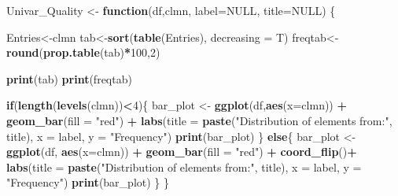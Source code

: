 \documentclass[
]{article}
\newenvironment{Shaded}{\begin{snugshade}}{\end{snugshade}}
\newcommand{\AttributeTok}[1]{\textcolor[rgb]{0.13,0.29,0.53}{#1}}
\newcommand{\ConstantTok}[1]{\textcolor[rgb]{0.56,0.35,0.01}{#1}}
\newcommand{\ControlFlowTok}[1]{\textcolor[rgb]{0.13,0.29,0.53}{\textbf{#1}}}
\newcommand{\DecValTok}[1]{\textcolor[rgb]{0.00,0.00,0.81}{#1}}
\newcommand{\FunctionTok}[1]{\textcolor[rgb]{0.13,0.29,0.53}{\textbf{#1}}}
\newcommand{\NormalTok}[1]{#1}
\newcommand{\OtherTok}[1]{\textcolor[rgb]{0.56,0.35,0.01}{#1}}
\newcommand{\SpecialCharTok}[1]{\textcolor[rgb]{0.81,0.36,0.00}{\textbf{#1}}}
\newcommand{\StringTok}[1]{\textcolor[rgb]{0.31,0.60,0.02}{#1}}
\begin{document}
\begin{Shaded}
\begin{Highlighting}[]
\NormalTok{Univar\_Quality }\OtherTok{\textless{}{-}} \ControlFlowTok{function}\NormalTok{(df,clmn, }\AttributeTok{label=}\ConstantTok{NULL}\NormalTok{, }\AttributeTok{title=}\ConstantTok{NULL}\NormalTok{) \{}
  
\NormalTok{  Entries}\OtherTok{\textless{}{-}}\NormalTok{clmn}
\NormalTok{  tab}\OtherTok{\textless{}{-}}\FunctionTok{sort}\NormalTok{(}\FunctionTok{table}\NormalTok{(Entries), }\AttributeTok{decreasing =}\NormalTok{ T)}
\NormalTok{  freqtab}\OtherTok{\textless{}{-}}\FunctionTok{round}\NormalTok{(}\FunctionTok{prop.table}\NormalTok{(tab)}\SpecialCharTok{*}\DecValTok{100}\NormalTok{,}\DecValTok{2}\NormalTok{)}

  \FunctionTok{print}\NormalTok{(tab)}
  \FunctionTok{print}\NormalTok{(freqtab)}
  
  \ControlFlowTok{if}\NormalTok{(}\FunctionTok{length}\NormalTok{(}\FunctionTok{levels}\NormalTok{(clmn))}\SpecialCharTok{\textless{}}\DecValTok{4}\NormalTok{)\{}
\NormalTok{      bar\_plot }\OtherTok{\textless{}{-}} \FunctionTok{ggplot}\NormalTok{(df,}\FunctionTok{aes}\NormalTok{(}\AttributeTok{x=}\NormalTok{clmn)) }\SpecialCharTok{+}
      \FunctionTok{geom\_bar}\NormalTok{(}\AttributeTok{fill =} \StringTok{"red"}\NormalTok{) }\SpecialCharTok{+}
      \FunctionTok{labs}\NormalTok{(}\AttributeTok{title =} \FunctionTok{paste}\NormalTok{(}\StringTok{"Distribution of elements from:"}\NormalTok{, title),}
           \AttributeTok{x =}\NormalTok{ label,}
           \AttributeTok{y =} \StringTok{"Frequency"}\NormalTok{)}
    \FunctionTok{print}\NormalTok{(bar\_plot)}
\NormalTok{  \} }\ControlFlowTok{else}\NormalTok{\{}
\NormalTok{  bar\_plot }\OtherTok{\textless{}{-}} \FunctionTok{ggplot}\NormalTok{(df, }\FunctionTok{aes}\NormalTok{(}\AttributeTok{x=}\NormalTok{clmn)) }\SpecialCharTok{+}
    \FunctionTok{geom\_bar}\NormalTok{(}\AttributeTok{fill =} \StringTok{"red"}\NormalTok{) }\SpecialCharTok{+}
    \FunctionTok{coord\_flip}\NormalTok{()}\SpecialCharTok{+}
    \FunctionTok{labs}\NormalTok{(}\AttributeTok{title =} \FunctionTok{paste}\NormalTok{(}\StringTok{"Distribution of elements from:"}\NormalTok{, title),}
         \AttributeTok{x =}\NormalTok{ label,}
         \AttributeTok{y =} \StringTok{"Frequency"}\NormalTok{)}
  \FunctionTok{print}\NormalTok{(bar\_plot)}
\NormalTok{  \}}
\NormalTok{\}}
\end{Highlighting}
\end{Shaded}
\end{document}
